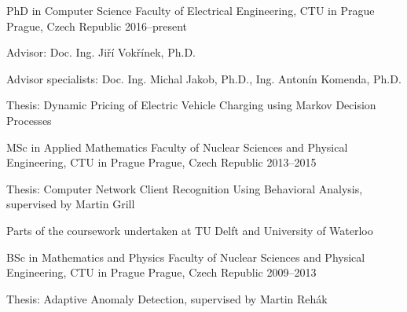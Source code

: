 

\begin{cventries}

  \cventry
    {PhD in Computer Science} %
    {Faculty of Electrical Engineering, CTU in Prague} %
    {Prague, Czech Republic} %
    {2016--present} %
    {
      \begin{cvitems} %
        \item {Advisor: Doc. Ing. Jiří Vokřínek, Ph.D.}
        \item {Advisor specialists: Doc. Ing. Michal Jakob, Ph.D., Ing. Antonín Komenda, Ph.D.}
        \item {Thesis: Dynamic Pricing of Electric Vehicle Charging using Markov Decision Processes}
      \end{cvitems}
    }


  \cventry
    {MSc in Applied Mathematics} %
    {Faculty of Nuclear Sciences and Physical Engineering, CTU in Prague} %
    {Prague, Czech Republic} %
    {2013--2015} %
    {
      \begin{cvitems} %
        \item {Thesis: Computer Network Client Recognition Using Behavioral Analysis, supervised by Martin Grill}
        \item {Parts of the coursework undertaken at TU Delft and University of Waterloo}
      \end{cvitems}
    }

  \cventry
    {BSc in Mathematics and Physics} %
    {Faculty of Nuclear Sciences and Physical Engineering, CTU in Prague} %
    {Prague, Czech Republic} %
    {2009--2013} %
    {
      \begin{cvitems} %
        \item {Thesis: Adaptive Anomaly Detection, supervised by Martin Rehák }
      \end{cvitems}
    }

\end{cventries}
